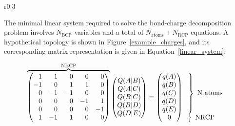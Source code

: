 \begin{wrapfigure}[5]{r}{0.3\textwidth}
  \centering
  \vspace{-2.5em}%
  
  \caption{Graph of a system with 5 atoms and 1 ring.}
  \label{example_charges}
\end{wrapfigure}

The minimal linear system required to solve the bond-charge decomposition
problem involves $N_{\text{BCP}}$ variables and a total of $N_{\text{atoms}} +
N_{\text{RCP}}$ equations. A hypothetical topology is shown in
Figure~\ref{example_charges}, and its corresponding matrix representation is
given in Equation~\ref{linear_system}.

\vspace{1em}%
\begin{align}
  \overbrace{
    \begin{pmatrix}
      \phantom{-}1 &  \phantom{-}1 &  \phantom{-}0 &  \phantom{-}0 &  \phantom{-}0 \\
     -1 &  \phantom{-}0 &  \phantom{-}1 &  \phantom{-}1 &  \phantom{-}0 \\
     \phantom{-}0 & -1 & -1 &  \phantom{-}0 & \phantom{-}0 \\
      \phantom{-}0 &  \phantom{-}0 &  \phantom{-}0 & -1 &  \phantom{-}1 \\
      \phantom{-}0 &  \phantom{-}0 &  \phantom{-}0 &  \phantom{-}0 &  -1 \\
      \phantom{-}1 & -1 &  \phantom{-}1 &  \phantom{-}0 &  \phantom{-}0
    \end{pmatrix}
  }^{\text{NBCP}}
    \begin{pmatrix}
      Q(A|B) \\
      Q(A|C) \\
      Q(B|C) \\
      Q(B|D) \\
      Q(D|E)
      \end{pmatrix}
    =
    \begin{pmatrix}
      q(A) \\
      q(B) \\
      q(C) \\
      q(D) \\
      q(E) \\
      0
    \end{pmatrix}
    \begin{array}{l}
      \left.\begin{array}{@{}c@{}}
      \\
      \\
      \\
      \\
      \\
    \end{array}\right\}\ \text{N atoms} \\[1ex]
      \left.\begin{array}{@{}c@{}}
      \\
    \end{array}\right\}\ \text{NRCP}
  \end{array}
  \label{linear_system}
\end{align}

